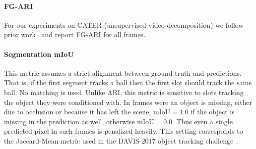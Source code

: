 \documentclass{article}
\begin{document}
\paragraph{FG-ARI}
For our experiments on CATER (unsupervised video decomposition) we follow prior work~\citep{kabra2021simone} and report FG-ARI for all frames.

\paragraph{Segmentation mIoU}
This metric assumes a strict alignment between ground truth and predictions. That is, if the first segment tracks a ball then the first slot should track the same ball. No matching is used. Unlike ARI, this metric is sensitive to slots tracking the object they were conditioned with. In frames were an object is missing, either due to occlusion or because it has left the scene, $\mathrm{mIoU} = 1.0$ if the object is missing in the prediction as well, otherwise $\mathrm{mIoU} = 0.0$. Thus even a single predicted pixel in such frames is penalized heavily. This setting corresponds to the Jaccard-Mean metric used in the DAVIS-2017 object tracking challenge~\citep{caelles2019the,ponttuset2017the}.
\end{document}
